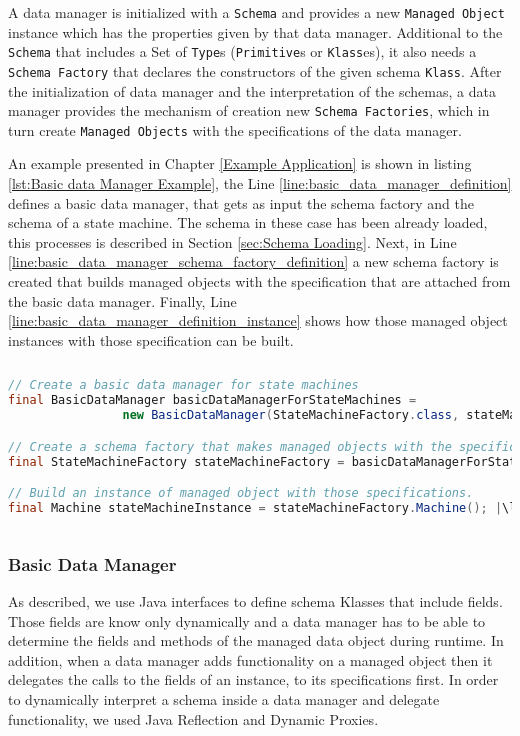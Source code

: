 A data manager is initialized with a \texttt{Schema} and provides a new \texttt{Managed Object} instance which has the properties given by that data manager.
Additional to the \texttt{Schema} that includes a Set of \texttt{Type}s (\texttt{Primitive}s or \texttt{Klass}es), it also needs a \texttt{Schema Factory} that declares the constructors of the given schema \texttt{Klass}.
After the initialization of data manager and the interpretation of the schemas, a data manager provides the mechanism of creation new  \texttt{Schema Factories}, which in turn create  \texttt{Managed Objects} with the specifications of the data manager.

An example presented in Chapter \ref{Example Application} is shown in listing \ref{lst:Basic data Manager Example}, the Line \ref{line:basic_data_manager_definition} defines a basic data manager, that gets as input the schema factory and the schema of a state machine. 
The schema in these case has been already loaded, this processes is described in Section \ref{sec:Schema Loading}.
Next, in Line \ref{line:basic_data_manager_schema_factory_definition} a new schema factory is created that builds managed objects with the specification that are attached from the basic data manager.
Finally, Line \ref{line:basic_data_manager_definition_instance} shows how those managed object instances with those specification can be built.

\begin{sourcecode} [H]
	\begin{lstlisting}[language=Java, escapechar=|]
// Create a basic data manager for state machines
final BasicDataManager basicDataManagerForStateMachines = 
				new BasicDataManager(StateMachineFactory.class, stateMachineSchema); |\label{line:basic_data_manager_definition}|

// Create a schema factory that makes managed objects with the specifications of the basic data manager.
final StateMachineFactory stateMachineFactory = basicDataManagerForStateMachines.make(); |\label{line:basic_data_manager_schema_factory_definition}|

// Build an instance of managed object with those specifications.
final Machine stateMachineInstance = stateMachineFactory.Machine(); |\label{line:basic_data_manager_definition_instance}|
	\end{lstlisting}
	\caption{Basic data Manager Example}
	\label{lst:Basic data Manager Example}
\end{sourcecode}

\subsubsection{Basic Data Manager}
As described, we use Java interfaces to define schema Klasses that include fields. 
Those fields are know only dynamically and a data manager has to be able to determine the fields and methods of the managed data object during runtime.
In addition, when a data manager adds functionality on a managed object then it delegates the calls to the fields of an instance, to its specifications first.
In order to dynamically interpret a schema inside a data manager and delegate functionality, we used Java Reflection and Dynamic Proxies.


